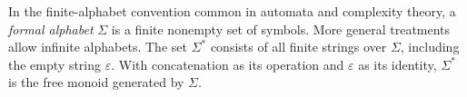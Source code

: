 
In the finite-alphabet convention common in automata and complexity theory, a \emph{formal alphabet} $\Sigma$ is a finite nonempty set of symbols. More general treatments allow infinite alphabets. The set $\Sigma^*$ consists of all finite strings over $\Sigma$, including the empty string $\varepsilon$. With concatenation as its operation and $\varepsilon$ as its identity, $\Sigma^*$ is the free monoid generated by $\Sigma$.
